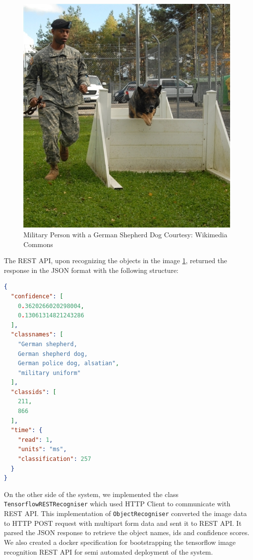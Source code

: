 \documentclass[letterpaper, 10 pt, conference]{ieeeconf}  %
\begin{document}
\begin{figure}[h]
    \centering
    \includegraphics[scale=0.50]{military_dog}
    \caption{Military Person with a German Shepherd Dog \newline Courtesy: Wikimedia Commons}
    \label{fig:military-dog}
\end{figure}
The REST API, upon recognizing the objects in the image \ref{fig:military-dog}, returned the response in the JSON format with the following structure:

\begin{lstlisting}[language=json, label=code:json-output,
	frame=single, xleftmargin=5.0pt, xrightmargin=5.0pt,
    caption=JSON Response from REST API]
{
  "confidence": [
    0.3620266020298004,
    0.13061314821243286
  ],
  "classnames": [
    "German shepherd,
    German shepherd dog,
    German police dog, alsatian",
    "military uniform"
  ],
  "classids": [
    211,
    866
  ],
  "time": {
    "read": 1,
    "units": "ms",
    "classification": 257
  }
}
\end{lstlisting}

On the other side of the system, we implemented the class \texttt{TensorflowRESTRecogniser} which used HTTP Client to communicate with REST API. This implementation of \texttt{ObjectRecogniser} converted the image data to HTTP POST request with multipart form data and sent it to REST API. It parsed the JSON response to retrieve the object names, ids and confidence scores. We also created a docker specification for bootstrapping the tensorflow image recognition REST API for semi automated deployment of the system.
\end{document}
